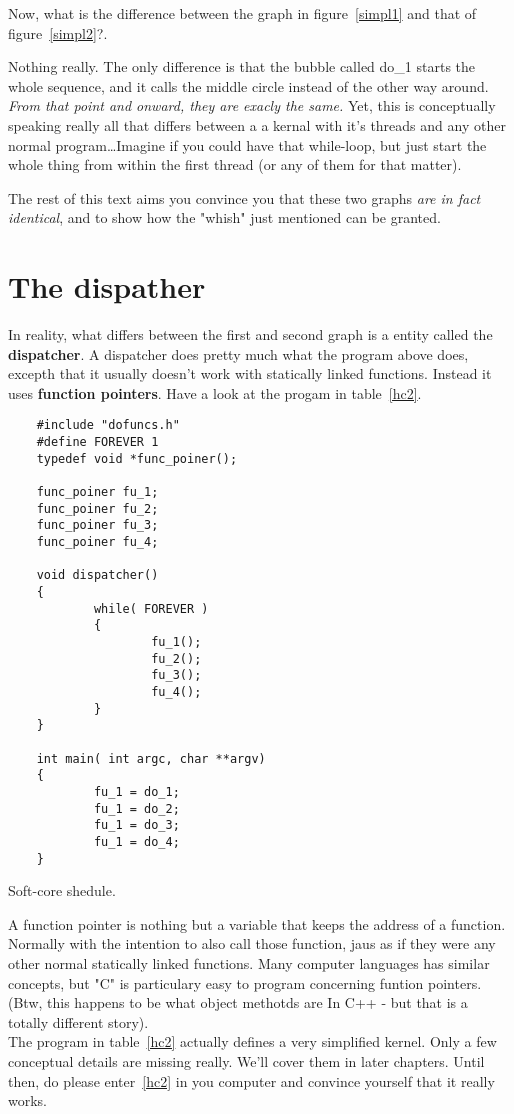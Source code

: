	Now, what is the difference between the graph in figure~\ref{simpl1} and that of figure~\ref{simpl2}?.

	Nothing really. The only difference is that the bubble called do\_1 starts the whole sequence, and it calls the middle circle instead of the other way around. \textit{From that point and onward, they are exacly the same.} Yet, this is conceptually speaking really all that differs between a a kernal with it's threads and any other normal program\ldots Imagine if you could have that while-loop, but just start the whole thing from within the first thread (or any of them for that matter).

	The rest of this text aims you convince you that these two graphs \textit{are in fact identical}, and to show how the "whish" just mentioned can be granted.

\section{The dispather}
	In reality, what differs between the first and second graph is a entity called the \textbf{dispatcher}. A dispatcher does pretty much what the program above does, excepth that it usually doesn't work with statically linked functions. Instead it uses \textbf{function pointers}. Have a look at the progam in table~\ref{hc2}.

	\begin{table}[!hbp]
	\begin{verbatim}
	#include "dofuncs.h"
	#define FOREVER 1
	typedef void *func_poiner();

	func_poiner fu_1;
	func_poiner fu_2;
	func_poiner fu_3;
	func_poiner fu_4;

	void dispatcher()
	{
	        while( FOREVER )
	        {
	                fu_1();
	                fu_2();
	                fu_3();
	                fu_4();
	        }
	}

	int main( int argc, char **argv)
	{
	        fu_1 = do_1;
	        fu_1 = do_2;
	        fu_1 = do_3;
	        fu_1 = do_4;
	}
	\end{verbatim}
	\caption{Soft-core shedule.\label{hc2}}
	\end{table}

	A function pointer is nothing but a variable that keeps the address of a function. Normally with the intention to also call those function, jaus as if they were any other normal statically linked functions. Many computer languages has similar concepts, but "C" is particulary easy to program concerning funtion pointers. (Btw, this happens to be what object methotds are In C++ - but that is a totally different story).
\\
	The program in table~\ref{hc2} actually defines a very simplified kernel. Only a few conceptual details are missing really. We'll cover them in later chapters. Until then, do please enter~\ref{hc2} in you computer and convince yourself that it really works.

